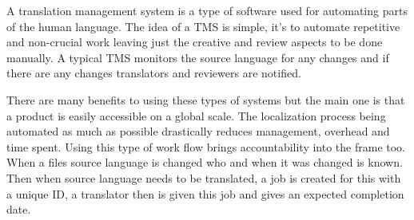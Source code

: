 A translation management system is a type of software used for automating parts of the human language. The idea of a TMS is simple, it’s to automate repetitive and non-crucial work leaving just the creative and review aspects to be done manually. A typical TMS monitors the source language for any changes and if there are any changes translators and reviewers are notified. 

There are many benefits to using these types of systems but the main one is that a product is easily accessible on a global scale. The localization process being automated as much as possible drastically reduces management, overhead and time spent. Using this type of work flow brings accountability into the frame too. When a files source language is changed who and when it was changed is known. Then when source language needs to be translated, a job is created for this with a unique ID, a translator then is given this job and gives an expected completion date. 
